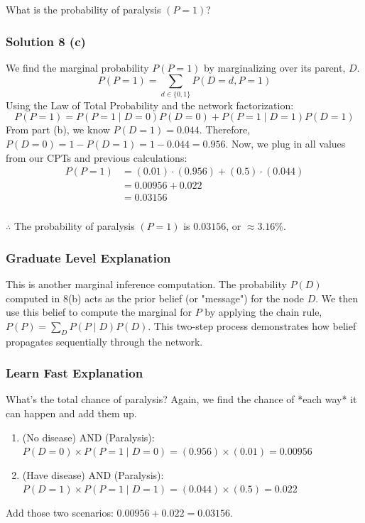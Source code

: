 \documentclass{article}
\begin{document}
{\begin{flushleft}
    What is the probability of paralysis $(P=1)$? 
\end{flushleft}

\subsubsection*{Solution 8 (c)}
We find the marginal probability $P(P=1)$ by marginalizing over its parent, $D$.
$$ P(P=1) = \sum_{d \in \{0,1\}} P(D=d, P=1) $$
Using the Law of Total Probability and the network factorization:
$$ P(P=1) = P(P=1 \mid D=0)P(D=0) + P(P=1 \mid D=1)P(D=1) $$
From part (b), we know $P(D=1) = 0.044$.
Therefore, $P(D=0) = 1 - P(D=1) = 1 - 0.044 = 0.956$.
Now, we plug in all values from our CPTs and previous calculations:
\begin{align*}
    P(P=1) &= (0.01) \cdot (0.956) + (0.5) \cdot (0.044) \\
           &= 0.00956 + 0.022 \\
           &= 0.03156
\end{align*}

\subsubsection*{\normalfont}{$\therefore$ The probability of paralysis $(P=1)$ is $0.03156$, or $\approx 3.16\%$.}

\subsubsection*{Graduate Level Explanation}
This is another marginal inference computation. The probability $P(D)$ computed in 8(b) acts as the prior belief (or "message") for the node $D$. We then use this belief to compute the marginal for $P$ by applying the chain rule, $P(P) = \sum_D P(P \mid D)P(D)$. This two-step process demonstrates how belief propagates sequentially through the network.

\subsubsection*{Learn Fast Explanation}
What's the total chance of paralysis? Again, we find the chance of *each way* it can happen and add them up.
\begin{enumerate}
    \item (No disease) AND (Paralysis): $P(D=0) \times P(P=1 \mid D=0) = (0.956) \times (0.01) = 0.00956$
    \item (Have disease) AND (Paralysis): $P(D=1) \times P(P=1 \mid D=1) = (0.044) \times (0.5) = 0.022$
\end{enumerate}
Add those two scenarios: $0.00956 + 0.022 = 0.03156$.

}
\end{document}
